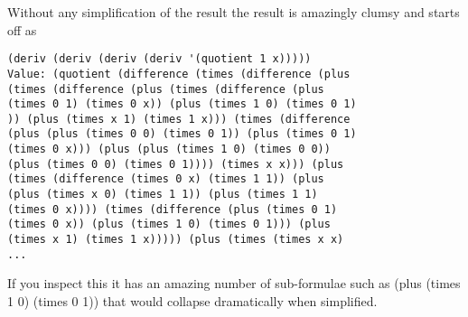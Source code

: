 Without any simplification of the result the result is amazingly clumsy and
starts off as
{\small\begin{verbatim}
(deriv (deriv (deriv (deriv '(quotient 1 x)))))
Value: (quotient (difference (times (difference (plus
(times (difference (plus (times (difference (plus
(times 0 1) (times 0 x)) (plus (times 1 0) (times 0 1)
)) (plus (times x 1) (times 1 x))) (times (difference
(plus (plus (times 0 0) (times 0 1)) (plus (times 0 1)
(times 0 x))) (plus (plus (times 1 0) (times 0 0))
(plus (times 0 0) (times 0 1)))) (times x x))) (plus
(times (difference (times 0 x) (times 1 1)) (plus
(plus (times x 0) (times 1 1)) (plus (times 1 1)
(times 0 x)))) (times (difference (plus (times 0 1)
(times 0 x)) (plus (times 1 0) (times 0 1))) (plus
(times x 1) (times 1 x))))) (plus (times (times x x)
...
\end{verbatim}}
If you inspect this it has an amazing number of sub-formulae
such as {\tx (plus (times 1 0) (times 0 1))} that would collapse
dramatically when simplified. 

